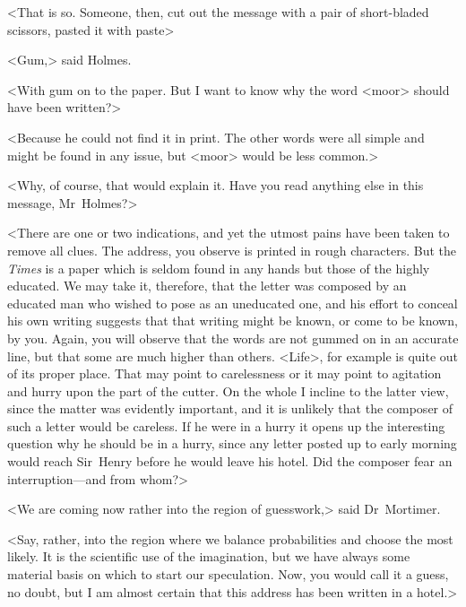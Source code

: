 <That is so. Someone, then, cut out the message with a pair of short-bladed scissors, pasted it with paste\longdash>

<Gum,> said Holmes.

<With gum on to the paper. But I want to know why the word <moor> should have been written?>

<Because he could not find it in print. The other words were all simple and might be found in any issue, but <moor> would be less common.>

<Why, of course, that would explain it. Have you read anything else in this message, Mr~Holmes?>




<There are one or two indications, and yet the utmost pains have been taken to remove all clues. The address, you observe is printed in rough characters. But the \textit{Times} is a paper which is seldom found in any hands but those of the highly educated. We may take it, therefore, that the letter was composed by an educated man who wished to pose as an uneducated one, and his effort to conceal his own writing suggests that that writing might be known, or come to be known, by you. Again, you will observe that the words are not gummed on in an accurate line, but that some are much higher than others. <Life>, for example is quite out of its proper place. That may point to carelessness or it may point to agitation and hurry upon the part of the cutter. On the whole I incline to the latter view, since the matter was evidently important, and it is unlikely that the composer of such a letter would be careless. If he were in a hurry it opens up the interesting question why he should be in a hurry, since any letter posted up to early morning would reach Sir~Henry before he would leave his hotel. Did the composer fear an interruption—and from whom?>

<We are coming now rather into the region of guesswork,> said Dr~Mortimer.


<Say, rather, into the region where we balance probabilities and choose the most likely. It is the scientific use of the imagination, but we have always some material basis on which to start our speculation. Now, you would call it a guess, no doubt, but I am almost certain that this address has been written in a hotel.>


